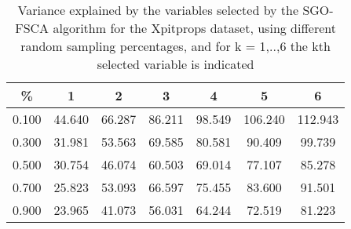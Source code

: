 \begin{table}
	\begin{center}
		\begin{tabular}{c c c c c c c}
			\% & 1 & 2 & 3 & 4 & 5 & 6 \\
			\hline
			0.100 & 44.640 & 66.287 & 86.211 & 98.549 & 106.240 & 112.943 \\
			0.300 & 31.981 & 53.563 & 69.585 & 80.581 & 90.409 & 99.739 \\
			0.500 & 30.754 & 46.074 & 60.503 & 69.014 & 77.107 & 85.278 \\
			0.700 & 25.823 & 53.093 & 66.597 & 75.455 & 83.600 & 91.501 \\
			0.900 & 23.965 & 41.073 & 56.031 & 64.244 & 72.519 & 81.223 \\
		\end{tabular}
	\end{center}
	\caption{Variance explained by the variables selected by the SGO-FSCA algorithm for the Xpitprops dataset, using different random sampling percentages, and for k = 1,..,6 the kth selected variable is indicated}
\end{table}
